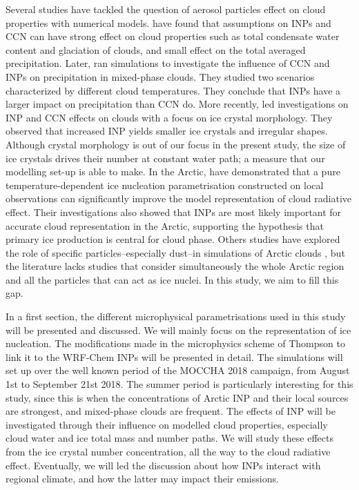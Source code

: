 Several studies have tackled the question of aerosol particles effect on cloud properties with numerical models.
\citet{seifert_aerosol-cloud-precipitation_2012} have found that assumptions on INPs and CCN can have strong effect on cloud properties such as total condensate water content and glaciation of clouds,  and small effect on the total averaged precipitation.
Later, \citet{fan_aerosol_2014} ran simulations to investigate the influence of CCN and INPs on precipitation in mixed-phase clouds. They studied two scenarios characterized by different cloud temperatures. They conclude that INPs have a larger impact on precipitation than CCN do.
More recently, \citet{lee_simulations_2024} led investigations on INP and CCN effects on clouds with a focus on ice crystal morphology. They observed that increased INP yields smaller ice crystals and irregular shapes. Although crystal morphology is out of our focus in the present study, the size of ice crystals drives their number at constant water path; a measure that our modelling set-up is able to make.
In the Arctic, \citet{gjelsvik_using_2025} have demonstrated that a pure temperature-dependent ice nucleation parametrisation constructed on local observations can significantly improve the model representation of cloud radiative effect. Their investigations also showed that INPs are most likely important for accurate cloud representation in the Arctic, supporting the hypothesis that primary ice production is central for cloud phase.
Others studies have explored the role of specific particles\---especially dust\---in simulations of Arctic clouds \citep{english_contributions_2014, shi_relative_2022, kawai_dominant_2023}, but the literature lacks studies that consider simultaneously the whole Arctic region and all the particles that can act as ice nuclei.
In this study, we aim to fill this gap.


\vspace{\baselineskip}
In a first section, the different microphysical parametrisations used in this study will be presented and discussed. We will mainly focus on the representation of ice nucleation. The modifications made in the microphysics scheme of Thompson to link it to the WRF-Chem INPs will be presented in detail.
The simulations will set up over the well known period of the MOCCHA 2018 campaign, from August 1st to September 21st 2018. The summer period is particularly interesting for this study, since this is when the concentrations of Arctic INP and their local sources are strongest, and mixed-phase clouds are frequent.
The effects of INP will be investigated through their influence on modelled cloud properties, especially cloud water and ice total mass and number paths. We will study these effects from the ice crystal number concentration, all the way to the cloud radiative effect. %
Eventually, we will led the discussion about how INPs interact with regional climate, and how the latter may impact their emissions.


